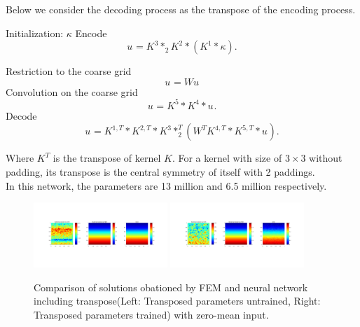 Below we consider the decoding process as the transpose of the encoding process.
\begin{breakablealgorithm}
	\caption{$u={\rm DarcyCNN_{transpose}}(\kappa; f_d, coarse\_grid\_size,)$}
	\label{alg:mgnet}
	\begin{algorithmic}
		\State Initialization:  $\kappa$
		\State Encode
		\begin{equation}
		u^{} = K^{3}  \ast_2   K^{ 2}\ast  (K^{ 1}\ast \kappa).
		\end{equation}
		
		\State Restriction to the coarse grid
		\begin{equation}
		u^{} =   W u^{}
		\end{equation}
		\State
		Convolution on the coarse grid
		\begin{equation}
		u^{} =   K^{ 5}\ast K^{ 4}\ast u^{}.
		\end{equation}
		\State Decode
		\begin{equation}
		u^{} =  K^{ 1,T} \ast K^{ 2,T}\ast K^{3}  \ast_2^T (W^{ T}  K^{ 4,T}\ast K^{ 5,T}\ast u^{}).
		\end{equation}
	\end{algorithmic}
\end{breakablealgorithm}
Where $K^T$ is the transpose of kernel $K$. For a kernel with size of $3 \times 3$ without padding, its transpose is the central symmetry of itself with 2 paddings.\\

In this network, the parameters are 13 million and 6.5 million respectively.

	\begin{figure}[H]
		\centering
		\includegraphics[width=0.45\textwidth]{figures/Darcy_CNN/Darcy_transpose_value_mean.png}
		\includegraphics[width=0.45\textwidth]{figures/Darcy_CNN/Darcy_transpose_novalue_mean.png}
		\caption{Comparison of solutions obationed by FEM and neural network including transpose(Left: Transposed parameters untrained, Right: Transposed parameters trained) with zero-mean input.}
	\end{figure}
	

